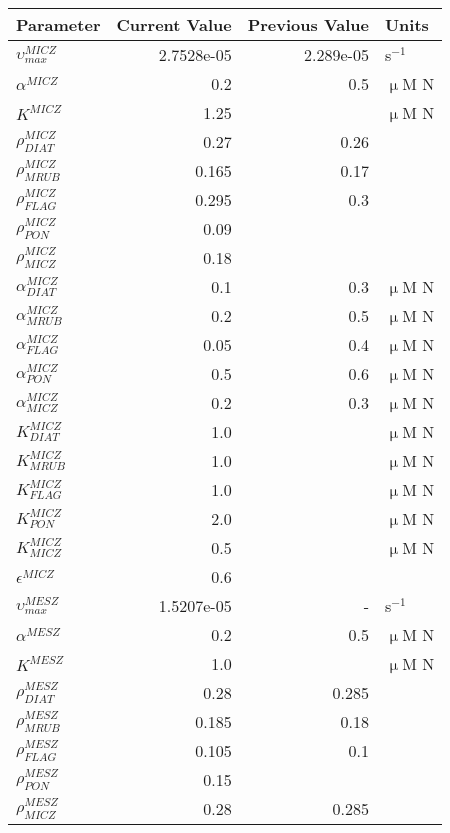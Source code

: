   \small
   \centering
   \begin{tabular}{lrrl}\toprule
    Parameter & Current Value & Previous Value & Units \\ \midrule
     $\upsilon_{max}^{MICZ}$ & 2.7528e-05 & 2.289e-05 & s$^{-1}$ \\
     $\alpha^{MICZ}$ & 0.2 & 0.5 & $\upmu$M N \\
     $K^{MICZ}$ & 1.25 &   & $\upmu$M N \\
     $\rho_{DIAT}^{MICZ}$ & 0.27 & 0.26 &  \\
     $\rho_{MRUB}^{MICZ}$ & 0.165 & 0.17 &  \\
     $\rho_{FLAG}^{MICZ}$ & 0.295 & 0.3 &  \\
     $\rho_{PON}^{MICZ}$ & 0.09 &   &  \\
     $\rho_{MICZ}^{MICZ}$ & 0.18 &   &  \\
     $\alpha_{DIAT}^{MICZ}$ & 0.1 & 0.3 & $\upmu$M N \\
     $\alpha_{MRUB}^{MICZ}$ & 0.2 & 0.5 & $\upmu$M N \\
     $\alpha_{FLAG}^{MICZ}$ & 0.05 & 0.4 & $\upmu$M N \\
     $\alpha_{PON}^{MICZ}$ & 0.5 & 0.6 & $\upmu$M N \\
     $\alpha_{MICZ}^{MICZ}$ & 0.2 & 0.3 & $\upmu$M N \\
     $K_{DIAT}^{MICZ}$ & 1.0 &   & $\upmu$M N \\
     $K_{MRUB}^{MICZ}$ & 1.0 &   & $\upmu$M N \\
     $K_{FLAG}^{MICZ}$ & 1.0 &   & $\upmu$M N \\
     $K_{PON}^{MICZ}$ & 2.0 &   & $\upmu$M N \\
     $K_{MICZ}^{MICZ}$ & 0.5 &   & $\upmu$M N \\
     $\epsilon^{MICZ}$ & 0.6 &   &  \\
     $\upsilon_{max}^{MESZ}$ & 1.5207e-05 & - & s$^{-1}$ \\
     $\alpha^{MESZ}$ & 0.2 & 0.5 & $\upmu$M N \\
     $K^{MESZ}$ & 1.0 &   & $\upmu$M N \\
     $\rho_{DIAT}^{MESZ}$ & 0.28 & 0.285 &  \\
     $\rho_{MRUB}^{MESZ}$ & 0.185 & 0.18 &  \\
     $\rho_{FLAG}^{MESZ}$ & 0.105 & 0.1 &  \\
     $\rho_{PON}^{MESZ}$ & 0.15 &   &  \\
     $\rho_{MICZ}^{MESZ}$ & 0.28 & 0.285 &  \\

\end{tabular}
